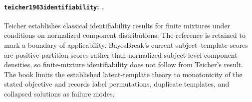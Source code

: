 \paragraph{\texttt{teicher1963identifiability}: \citet{teicher1963identifiability}.}
Teicher establishes classical identifiability results for finite mixtures under conditions on normalized component distributions. The reference is retained to mark a boundary of applicability. BayesBreak's current subject--template scores are positive partition scores rather than normalized subject-level component densities, so finite-mixture identifiability does not follow from Teicher's result. The book limits the established latent-template theory to monotonicity of the stated objective and records label permutations, duplicate templates, and collapsed solutions as failure modes.
